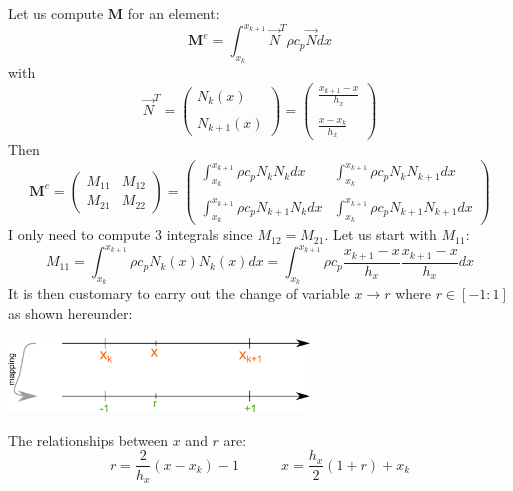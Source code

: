 Let us compute ${\bm M}$ for an element:
\[
{\bm M}^e=  \int_{x_k}^{x_{k+1}}   {\vec N}^T \rho c_p {\vec N} dx  
\]
with 
\[
{\vec N}^T = 
\left(
\begin{array}{c}
N_k(x)  \\ \\  N_{k+1}(x)
\end{array}
\right)
=
\left(
\begin{array}{c}
\frac{x_{k+1}-x}{h_x}   \\ \\
\frac{x-x_k}{h_x} 
\end{array}
\right)
\]
Then 
\[
{\bm M}^e
=
\left(
\begin{array}{cc}
M_{11} & M_{12} \\
M_{21} & M_{22} 
\end{array}
\right)
=
\left(
\begin{array}{cc}
\int_{x_k}^{x_{k+1}} \rho c_p N_k N_{k} dx   &  \int_{x_k}^{x_{k+1}} \rho c_p N_k N_{k+1} dx \\ \\
\int_{x_k}^{x_{k+1}} \rho c_p N_{k+1} N_{k} dx  &  \int_{x_k}^{x_{k+1}} \rho c_p N_{k+1} N_{k+1} dx 
\end{array}
\right)
\]
I only need to compute 3 integrals since $M_{12}=M_{21}$.
Let us start with $M_{11}$:
\[
M_{11}=\int_{x_k}^{x_{k+1}} \rho c_p N_k(x) N_{k}(x) dx
=   
\int_{x_k}^{x_{k+1}} \rho c_p 
\frac{x_{k+1}-x}{h_x}  
\frac{x_{k+1}-x}{h_x}  
dx
\]
It is then customary to carry out the change of variable $x \rightarrow r$ where 
$r \in [-1:1]$ as shown hereunder:
\begin{center}
\includegraphics[width=8cm]{images/oneD/el1D_mapping}
\end{center}
The relationships between $x$ and $r$ are:
\[
r=\frac{2}{h_x}(x-x_k)-1
\quad\quad\quad
x=\frac{h_x}{2}(1+r)+x_k
\]

